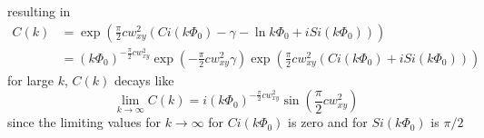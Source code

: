 \documentclass[%
 reprint,
 amsmath,amssymb,
 aps,
]{revtex4-1}
\begin{document}
resulting in
\begin{equation}
	\begin{aligned}
	C(k) &= \exp\left(\frac{\pi}{2}cw_{xy}^{2}\left(Ci(k\Phi_{0})-\gamma-\ln k\Phi_{0}+iSi(k\Phi_{0})\right)\right)\\
	&=(k\Phi_{0})^{-\frac{\pi}{2}cw_{xy}^{2}}\exp\left(-\frac{\pi}{2}cw_{xy}^{2}\gamma\right)\exp\left(\frac{\pi}{2}cw_{xy}^{2}\left(Ci(k\Phi_{0})+iSi(k\Phi_{0})\right)\right)
	\end{aligned}
\end{equation}
for large $k$, $C(k)$ decays like
\begin{equation}
	\lim_{k\rightarrow \infty} C(k) = i(k\Phi_{0})^{-\frac{\pi}{2}cw_{xy}^{2}}\sin \left(\frac{\pi}{2}cw_{xy}^{2}\right)
\end{equation}
since the limiting values for $k\rightarrow \infty$ for $Ci(k\Phi_{0})$ is zero and for $Si(k\Phi_{0})$ is $\pi/2$
\end{document}
